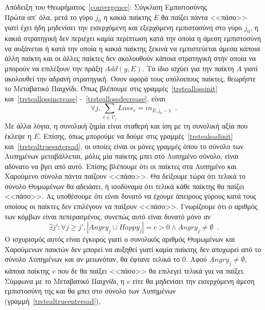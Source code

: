 \begin{sepproof}{Απόδειξη του Θεωρήματος~\ref{convergence}: Σύγκλιση Εμπιστοσύνης} \ \\
\label{convergenceproof}
  Πρώτα απ' όλα, μετά το γύρο $j_0$ η κακιά παίκτης $E$ θα παίζει πάντα <<πάσο>> γιατί έχει ήδη μηδενίσει την εισερχόμενη και
  εξερχόμενη εμπιστοσύνη στο γύρο $j_0$, η κακιά στρατηγική δεν περιέχει καμία περίπτωση κατά την οποία η άμεση εμπιστοσύνη να
  αυξάνεται ή κατά την οποία η κακιά παίκτης ξεκινά να εμπιστεύεται άμεσα κάποια άλλη παίκτη και οι άλλες παίκτες δεν
  ακολουθούν κάποια στρατηγική στην οποία να μπορούν να επιλέξουν την πράξη $Add\left(y, E\right)$. Το ίδιο ισχύει για την
  παίκτη $A$ γιατί ακολουθεί την αδρανή στρατηγική. Όσον αφορά τους υπόλοιπους παίκτες, θεωρήστε το Μεταβατικό Παιχνίδι. Όπως
  βλέπουμε στις γραμμές~\ref{trsteallossinit} και~\ref{trsteallossincrease} -~\ref{trsteallossdecrease}, είναι
  \begin{equation*}
    \forall j, \sum\limits_{v \in \mathcal{V}_j}Loss_v = in_{E, j_0-1} \enspace.
  \end{equation*}
  Με άλλα λόγια, η συνολική ζημία είναι σταθερή και ίση με τη συνολική αξία που έκλεψε η $E$. Επίσης, όπως μπορούμε να δούμε
  στις γραμμές~\ref{trstealsadinit} και~\ref{trstealtrueentersad}, οι οποίες είναι οι μόνες γραμμές όπου το σύνολο των
  Λυπημένων μεταβάλλεται, μόλις μία παίκτης μπει στο Λυπημένο σύνολο, είναι αδύνατο να βγει από αυτό. Επίσης βλέπουμε ότι οι
  παίκτες στα Λυπημένο και Χαρούμενο σύνολα πάντα παίζουν <<πάσο>>. Θα δείξουμε τώρα ότι τελικά το σύνολο Θυμωμένων θα
  αδειάσει, ή ισοδύναμα ότι τελικά κάθε παίκτης θα παίζει <<πάσο>>. Ας υποθέσουμε ότι είναι δυνατό να έχουμε άπειρους γύρους
  κατά τους οποίους οι παίκτες δεν επιλέγουν να παίξουν <<πάσο>>. Γνωρίζουμε ότι ο αριθμός των κόμβων είναι πεπερασμένος,
  συνεπώς αυτό είναι δυνατό μόνο αν
  \begin{equation*}
    \exists j': \forall j \geq j', |Angry_j \cup Happy_j| = c > 0 \wedge Angry_j \neq \emptyset \enspace.
  \end{equation*}
  Ο ισχυρισμός αυτός είναι έγκυρος γιατί ο συνολικός αριθμός Θυμωμένων και Χαρούμενων παικτών δεν μπορεί να αυξηθεί γιατί
  καμία παίκτης δεν αποχωρεί από το σύνολο Λυπημένων και αν μειωνόταν, θα έφτανε τελικά το 0. Αφού $Angry_j \neq \emptyset$,
  κάποια παίκτης $v$ που δε θα παίξει <<πάσο>> θα επιλεγεί τελικά για να παίξει. Σύμφωνα με το Μεταβατικό Παιχνίδι, η $v$ είτε
  θα μηδενίσει την εισερχόμενη άμεση εμπιστοσύνη της και θα μπει στο σύνολο των Λυπημένων (γραμμή~\ref{trstealtrueentersad}),

\end{sepproof}
